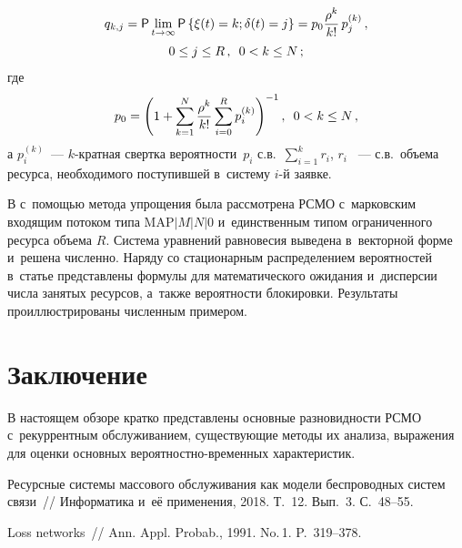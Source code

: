 \begin{multicols}{2}
\vspace*{-12pt}

\noindent
\begin{multline*}
q_{k,j}={\sf P}\lim\limits_{t\rightarrow \infty}{\sf P} \left\{ \xi(t)=k; 
\delta(t)=j\right\}=p_0\displaystyle\frac{\displaystyle \rho^k\mathstrut}{\displaystyle k!\mathstrut}\,p_j^{(k)}\,,
\\ 0\leq j\leq R\,,\enskip 0<k\leq N\,;
\end{multline*}
где
\begin{equation*}
p_0=\left( 1+\sum\limits_{k=1}^{N}\displaystyle\frac{\displaystyle \rho^k\mathstrut}{\displaystyle k!\mathstrut}\sum_{i=0}^{R}p_i^{(k)} 
\right)^{-1},
\enskip 0<k\leq N\,,
\end{equation*}
а $p^{(k)}_i$~--- $k$-кратная свертка вероятности~$p_i$ с.в.\ 
$\sum\nolimits_{i=1}^{k}r_i$, $r_i$ ~--- с.в.\ объема ресурса, необходимого поступившей 
в~сис\-те\-му $i$-й заявке.

В \cite{Sopin_17_2018} с~помощью метода упрощения была рассмотрена РСМО 
с~марковским входящим потоком типа $\mathrm{MAP}|M|N|0$ и~единственным типом ограниченного 
ресурса объема $R$. Система уравнений равновесия выведена в~векторной форме 
и~решена численно. Наряду со стационарным распределением вероятностей в~статье 
представлены формулы для математического ожидания и~дисперсии числа занятых 
ресурсов, а~также вероятности блокировки. Результаты проиллюстрированы численным 
примером.

\vspace*{-9pt}

\section{Заключение}

В настоящем обзоре кратко представлены основные разновидности РСМО
 с~рекуррентным обслуживанием, существующие методы их 
анализа, выражения для оценки основных ве\-ро\-ят\-но\-ст\-но-вре\-мен\-ных характеристик.

\vspace*{-9pt}

{\small\frenchspacing
 {%
 \begin{thebibliography}{99}

Ресурсные сис\-те\-мы массового обслуживания как модели беспроводных сис\-тем связи~// 
{Информатика и~её применения}, 2018. Т.~12. Вып.~3. С.~48--55.

Loss networks~// {Ann. Appl. Probab.}, 1991. No.\,1. P.~319--378.


\end{thebibliography}}}
\end{multicols}
